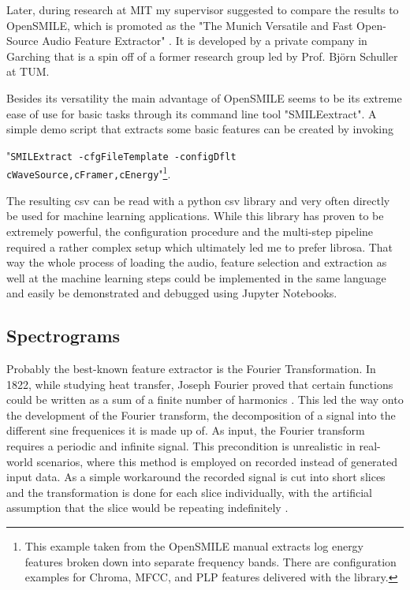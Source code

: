 Later, during research at MIT my supervisor suggested to compare the results to OpenSMILE, which is promoted as the "The Munich Versatile and Fast Open-Source Audio Feature Extractor" \cite{Eyben:2013:RDO:2502081.2502224}. It is developed by a private company in Garching that is a spin off of a former research group led by Prof. Björn Schuller at TUM.

Besides its versatility the main advantage of OpenSMILE seems to be its extreme ease of use for basic tasks through its command line tool "SMILEextract". A simple demo script that extracts some basic features can be created by invoking 

"\texttt{SMILExtract -cfgFileTemplate -configDflt cWaveSource,cFramer,cEnergy}"\footnote{This example taken from the OpenSMILE manual extracts log energy features broken down into separate frequency bands. There are configuration examples for Chroma, MFCC, and PLP features delivered with the library.}.

The resulting csv can be read with a python csv library and very often directly be used for machine learning applications. While this library has proven to be extremely powerful, the  configuration procedure and the multi-step pipeline required a rather complex setup which ultimately led me to prefer librosa. That way the whole process of loading the audio, feature selection and extraction as well at the machine learning steps could be implemented in the same language and easily be demonstrated and debugged using Jupyter Notebooks.


\subsection{Spectrograms}

Probably the best-known feature extractor is the Fourier Transformation. In 1822, while studying heat transfer, Joseph Fourier proved that certain functions could be written as a sum of a finite number of harmonics \cite{fourier1878}. This led the way onto the development of the Fourier transform, the decomposition of a signal into the different sine frequenices it is made up of. As input, the Fourier transform requires a periodic and infinite signal. This precondition is unrealistic in real-world scenarios, where this method is employed on recorded instead of generated input data. As a simple workaround the recorded signal is cut into short slices and the transformation is done for each slice individually, with the artificial assumption that the slice would be repeating indefinitely \cite{Smith97}.

